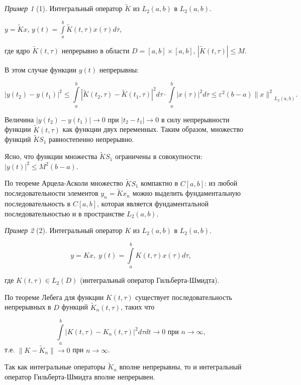 \documentclass[12pt,a4paper,titlepage,oneside]{book}
\theoremstyle{definition}
\theoremstyle{plain}
\theoremstyle{break}
\theoremstyle{remark}
\theoremstyle{remark}
\newtheorem*{example}{Пример}
\theoremstyle{remark}
\theoremstyle{remark}
\theoremstyle{plain}
\theoremstyle{plain}
\begin{document}
\begin{example}[1]
Интегральный оператор $\widetilde{K}$ из $L_2(a,b)$ в $L_2(a,b)$.

\begin{center}
$y=\widetilde{K}x$, $y(t)=\displaystyle\int\limits_a^b \widetilde{K}(t, \tau)x(\tau)d\tau$,
\end{center}

где ядро $\widetilde{K}(t, \tau)$ непрерывно в области $D=[a,b]\times[a,b]$, $|\widetilde{K}(t, \tau)|\leqslant M$.

В этом случае функции $y(t)$ непрерывны:

$$|y(t_2)-y(t_1)|^2\leq \displaystyle\int\limits_a^b |\widetilde{K}(t_2, \tau)-\widetilde{K}(t_1, \tau)|^2d\tau \cdot \displaystyle\int\limits_a^b |x(\tau)|^2 d\tau \leqslant \varepsilon^2 (b-a){\lVert x\rVert^2}_{L_2(a,b)}.$$

Величина $|y(t_2)-y(t_1)|\to 0$ при $|t_2-t_1|\to 0$ в силу непрерывности функции $\widetilde{K}(t, \tau)$ как функции двух переменных. Таким образом, множество функций $\widetilde{K} S_1$ равностепенно непрерывно.

Ясно, что функции множества $\widetilde{K} S_1$ ограничены в совокупности: $|y(t)|^2 \leqslant M^2 (b-a)$.

По теореме Арцела-Асколи множество $\widetilde{K} S_1$ компактно в $C[a,b]$: из любой последовательности элементов $y_n=\widetilde{K} x_n$ можно выделить фундаментальную последовательность в $C[a,b]$, которая является фундаментальной последовательностью и в пространстве $L_2 (a,b)$.
\end{example}

\begin{example}[2]
Интегральный оператор $K$ из $L_2(a,b)$ в $L_2(a,b)$.

$$y=Kx, \; y(t) = \displaystyle\int\limits_a^b K(t, \tau)x(\tau)d\tau,$$

где $K(t, \tau)\in L_2(D)$ (интегральный оператор Гильберта-Шмидта).

По теореме Лебега для функции $K(t, \tau)$ существует последовательность непрерывных в $D$ функций $\widetilde{K}_n (t, \tau)$, таких что

$$\displaystyle\int\limits_a^b \big\vert K(t, \tau) - K_n(t, \tau)\big\vert^2d\tau dt \to 0 \mbox{ при } n\to \infty,$$
т.е. $\lVert K-\widetilde{K}_n \rVert \to 0$ при $n\to \infty$.

Так как интегральные операторы $\widetilde{K}_n$ вполне непрерывны, то и интегральный оператор Гильберта-Шмидта вполне непрерывен.
\end{example}
\end{document}
